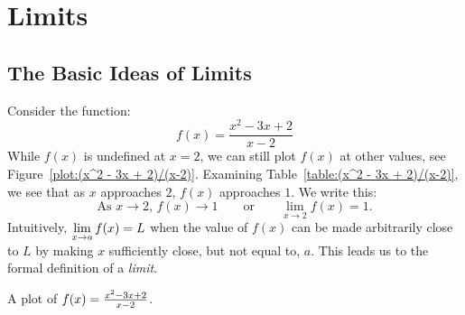 \chapter{Limits}



\section{The Basic Ideas of Limits}{}{}



Consider the function:
\[
f(x) = \frac{x^2 - 3x + 2}{x-2}
\]
While $f(x)$ is undefined at $x=2$, we can still plot $f(x)$ at other
values, see Figure~\ref{plot:(x^2 - 3x + 2)/(x-2)}. Examining
Table~\ref{table:(x^2 - 3x + 2)/(x-2)}, we see that as $x$ approaches
$2$, $f(x)$ approaches $1$. We write this: 
\[
\text{As $x \to 2$, $f(x) \to 1$}\qquad\text{or}\qquad \lim_{x\to 2} f(x) = 1.
\]
Intuitively, $\displaystyle\lim_{x\to a} f(x) = L$ when the value of $f(x)$ can
be made arbitrarily close to $L$ by making $x$ sufficiently close, but
not equal to, $a$.  This leads us to the formal definition of a
\textit{limit}.
\begin{marginfigure}[-5in]
\caption{A plot of $f(x)=\protect\frac{x^2 - 3x + 2}{x-2}$.}
\label{plot:(x^2 - 3x + 2)/(x-2)}
\end{marginfigure}


